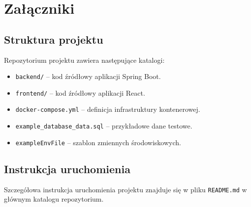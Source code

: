 ﻿\documentclass[a4paper,twoside,11pt]{mwrep}
\theoremstyle{plain} \newtheorem{thm}{Twierdzenie}
\theoremstyle{plain} \newtheorem{lem}{Lemat}
\theoremstyle{definition} \newtheorem{defn}{Definicja}
\theoremstyle{remark} \newtheorem*{rem}{Wniosek}
\begin{document}
\chapter*{Załączniki}

\section*{Struktura projektu}

Repozytorium projektu zawiera następujące katalogi:
\begin{itemize}
    \item \texttt{backend/} -- kod źródłowy aplikacji Spring Boot.
    \item \texttt{frontend/} -- kod źródłowy aplikacji React.
    \item \texttt{docker-compose.yml} -- definicja infrastruktury kontenerowej.
    \item \texttt{example\_database\_data.sql} -- przykładowe dane testowe.
    \item \texttt{exampleEnvFile} -- szablon zmiennych środowiskowych.
\end{itemize}

\section*{Instrukcja uruchomienia}

Szczegółowa instrukcja uruchomienia projektu znajduje się w pliku \texttt{README.md} w głównym katalogu repozytorium.
\end{document}
